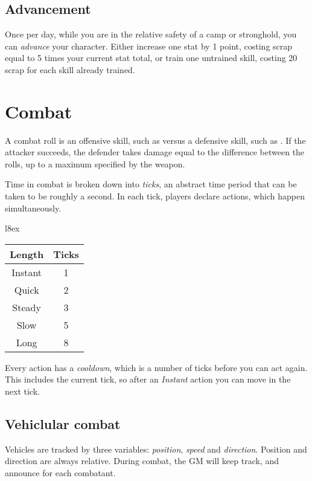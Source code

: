 \documentclass[10pt, a4paper, twocolumn]{article}
\begin{document}
\subsection{Advancement}
Once per day, while you are in the relative safety of a camp or stronghold, you
can \emph{advance} your character. Either increase one stat by 1 point,
costing scrap equal to 5 times your current stat total, or train one untrained
skill, costing 20 scrap for each skill already trained.

\section{Combat}
A combat roll is an offensive skill, such as  versus
a defensive skill, such as . If the attacker succeeds, the
defender takes damage equal to the difference between the rolls, up to a maximum
specified by the weapon.

Time in combat is broken down into \emph{ticks}, an abstract time period that
can be taken to be roughly a second. In each tick, players declare actions,
which happen simultaneously.

\begin{wraptable}[5]{l}{8ex}
  \small
\vspace*{-4ex}
\hspace*{-4ex}
\begin{tabular}{cc}
  Length   & Ticks \\
  \hline 
  Instant  & 1     \\
  Quick    & 2     \\
  Steady   & 3     \\
  Slow     & 5     \\
  Long     & 8
\end{tabular}
\end{wraptable}

Every action has a \emph{cooldown}, which is a number of ticks before you can
act again. This includes the current tick, so after an \emph{Instant} action you
can move in the next tick. 

\subsection{Vehiclular combat}
Vehicles are tracked  by three variables: \emph{position}, \emph{speed} and
\emph{direction}. Position and direction are always relative. During combat, the
GM will keep track, and announce for each combatant.
\end{document}
